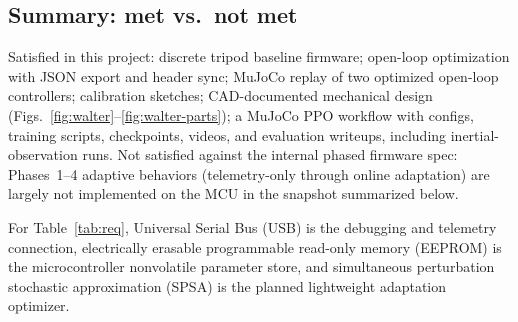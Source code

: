 \documentclass[11pt]{article}
\begin{document}
\subsection{Summary: met vs.\ not met}
Satisfied in this project: discrete tripod baseline firmware; open-loop optimization with JSON export and header sync; MuJoCo replay of two optimized open-loop controllers; calibration sketches; CAD-documented mechanical design (Figs.~\ref{fig:walter}--\ref{fig:walter-parts}); a MuJoCo PPO workflow with configs, training scripts, checkpoints, videos, and evaluation writeups, including inertial-observation runs. Not satisfied against the internal phased firmware spec: Phases~1--4 adaptive behaviors (telemetry-only through online adaptation) are largely not implemented on the MCU in the snapshot summarized below.

For Table~\ref{tab:req}, Universal Serial Bus (USB) is the debugging and telemetry connection, electrically erasable programmable read-only memory (EEPROM) is the microcontroller nonvolatile parameter store, and simultaneous perturbation stochastic approximation (SPSA) is the planned lightweight adaptation optimizer.
\end{document}
